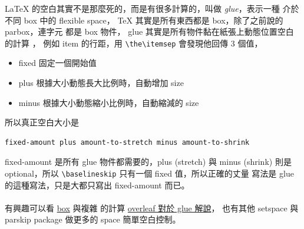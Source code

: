  \LaTeX{} 的空白其實不是那麼死的，而是有很多計算的，叫做 \emph{glue}，表示一種
  介於不同 box 中的 flexible space， \TeX{} 其實是所有東西都是 box，除了之前說的
  parbox，連字元 都是 box 物件， glue 其實是所有物件黏在紙張上動態位置空白的計算
  ， 例如 item 的行距，用 \verb=\the\itemsep= 會發現他回傳 3 個值，
  \begin{itemize}
    \item fixed 固定一個開始值
    \item plus 根據大小動態長大比例時，自動增加 size
    \item minus 根據大小動態縮小比例時，自動縮減的 size
  \end{itemize}
  所以真正空白大小是
  \begin{verbatim}
fixed-amount plus amount-to-stretch minus amount-to-shrink
  \end{verbatim}
  fixed-amount 是所有 glue 物件都需要的，plus (stretch) 與 minus (shrink)
  則是 optional，所以 \verb=\baselineskip= 只有一個 fixed 值，所以正確的丈量
  寫法是 glue 的這種寫法，只是大都只寫出 fixed-amount 而已。
  \\\\
  有興趣可以看 \href{https://en.wikibooks.org/wiki/LaTeX/Boxes}{box} 與複雜
  的計算
  \href{https://www.overleaf.com/learn/latex/Articles/How_to_change_paragraph_spacing_in_LaTeX#A_few_notes_on_glue}
  {overleaf 對於 glue 解說}， 也有其他 setspace 與 parskip package 做更多的
  space 簡單空白控制。

